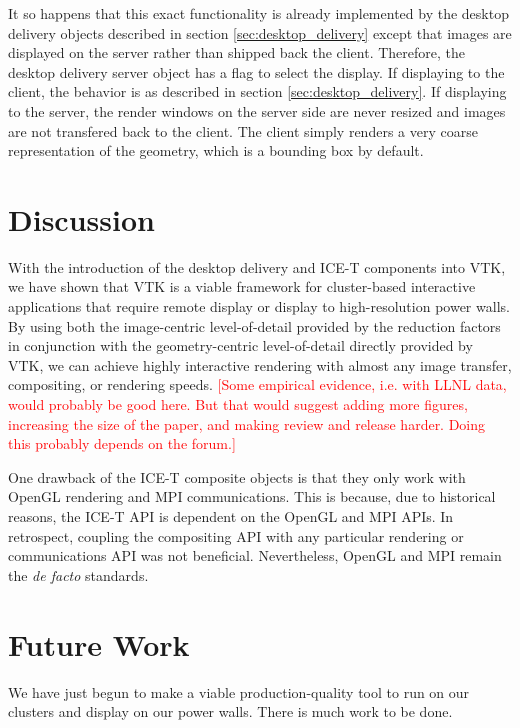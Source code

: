 \documentclass[twocolumn]{article}
\newcommand{\sticky}[1]{\textcolor{Red}{[#1]}}
\begin{document}
  It so happens that this exact functionality is already implemented by the
  desktop delivery objects described in section \ref{sec:desktop_delivery}
  except that images are displayed on the server rather than shipped back
  the client.  Therefore, the desktop delivery server object has a flag to
  select the display.  If displaying to the client, the behavior is as
  described in section \ref{sec:desktop_delivery}.  If displaying to the
  server, the render windows on the server side are never resized and
  images are not transfered back to the client.  The client simply renders
  a very coarse representation of the geometry, which is a bounding box by
  default.


  \section{Discussion}
  \label{sec:discussion}

  With the introduction of the desktop delivery and ICE-T components into
  VTK, we have shown that VTK is a viable framework for cluster-based
  interactive applications that require remote display or display to
  high-resolution power walls.  By using both the image-centric
  level-of-detail provided by the reduction factors in conjunction with the
  geometry-centric level-of-detail directly provided by VTK, we can achieve
  highly interactive rendering with almost any image transfer, compositing,
  or rendering speeds.  \sticky{Some empirical evidence, i.e. with LLNL
  data, would probably be good here.  But that would suggest adding more
  figures, increasing the size of the paper, and making review and release
  harder.  Doing this probably depends on the forum.}

  One drawback of the ICE-T composite objects is that they only work with
  OpenGL rendering and MPI communications.  This is because, due to
  historical reasons, the ICE-T API is dependent on the OpenGL and MPI
  APIs.  In retrospect, coupling the compositing API with any particular
  rendering or communications API was not beneficial.  Nevertheless, OpenGL
  and MPI remain the \emph{de facto} standards.


  \section{Future Work}
  \label{sec:future_work}

  We have just begun to make a viable production-quality tool to run on our
  clusters and display on our power walls.  There is much work to be done.
\end{document}
